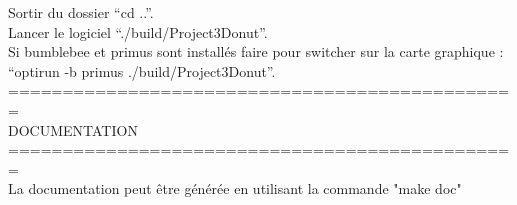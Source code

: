 Sortir du dossier ``cd ..''.\\

Lancer le logiciel ``./build/Project3Donut''.\\

Si bumblebee et primus sont installés faire pour switcher sur la carte graphique : ``optirun -b primus ./build/Project3Donut''.\\

===============================================\\
DOCUMENTATION\\
===============================================\\
La documentation peut être générée en utilisant la commande "make doc"\\
